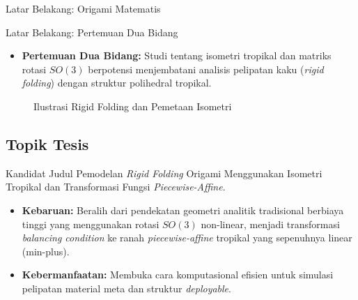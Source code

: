 \documentclass[aspectratio=169]{beamer}
\begin{document}
\begin{frame}{Latar Belakang: Origami Matematis}
\begin{center}
  \end{center}
\end{frame}

\begin{frame}{Latar Belakang: Pertemuan Dua Bidang}
  \begin{itemize}
    \item \textbf{Pertemuan Dua Bidang:} Studi tentang isometri tropikal dan matriks rotasi $SO(3)$ berpotensi menjembatani analisis pelipatan kaku (\textit{rigid folding}) dengan struktur polihedral tropikal.
  \end{itemize}
  \vspace{0.3cm}
  \begin{figure}[h]
    \centering
    \caption{Ilustrasi Rigid Folding dan Pemetaan Isometri}
  \end{figure}
\end{frame}

\subsection{Topik Tesis}
\begin{frame}{\insertsection}{\insertsubsection}
  \begin{block}{Kandidat Judul}
    Pemodelan \emph{Rigid Folding} Origami Menggunakan Isometri Tropikal dan Transformasi Fungsi \textit{Piecewise-Affine}.
  \end{block}
  \begin{itemize}
    \item \textbf{Kebaruan:} Beralih dari pendekatan geometri analitik tradisional berbiaya tinggi yang menggunakan rotasi $SO(3)$ non-linear, menjadi transformasi \textit{balancing condition} ke ranah \textit{piecewise-affine} tropikal yang sepenuhnya linear (min-plus).
    \item \textbf{Kebermanfaatan:} Membuka cara komputasional efisien untuk simulasi pelipatan material meta dan struktur \textit{deployable}.
  \end{itemize}
\end{frame}
\end{document}
